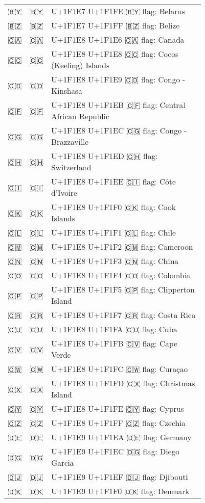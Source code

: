 \documentclass[a4paper,12pt]{ltjarticle}
\newcommand{\fontA}[1]{{\fontspec[RawFeature={mode=harf,+dist,+ccmp}]{Segoe UI Emoji} #1}}
\newcommand{\fontB}[1]{{\fontspec[RawFeature={mode=harf,+dist,+ccmp}]{Noto Color Emoji} #1}}
\begin{document}
\begin{longtable}[c]{ccp{0.8\linewidth}}
\fontA{🇧🇾}&\fontB{🇧🇾}&U+1F1E7 U+1F1FE 🇧🇾 flag: Belarus\\
\fontA{🇧🇿}&\fontB{🇧🇿}&U+1F1E7 U+1F1FF 🇧🇿 flag: Belize\\
\fontA{🇨🇦}&\fontB{🇨🇦}&U+1F1E8 U+1F1E6 🇨🇦 flag: Canada\\
\fontA{🇨🇨}&\fontB{🇨🇨}&U+1F1E8 U+1F1E8 🇨🇨 flag: Cocos (Keeling) Islands\\
\fontA{🇨🇩}&\fontB{🇨🇩}&U+1F1E8 U+1F1E9 🇨🇩 flag: Congo - Kinshasa\\
\fontA{🇨🇫}&\fontB{🇨🇫}&U+1F1E8 U+1F1EB 🇨🇫 flag: Central African Republic\\
\fontA{🇨🇬}&\fontB{🇨🇬}&U+1F1E8 U+1F1EC 🇨🇬 flag: Congo - Brazzaville\\
\fontA{🇨🇭}&\fontB{🇨🇭}&U+1F1E8 U+1F1ED 🇨🇭 flag: Switzerland\\
\fontA{🇨🇮}&\fontB{🇨🇮}&U+1F1E8 U+1F1EE 🇨🇮 flag: Côte d’Ivoire\\
\fontA{🇨🇰}&\fontB{🇨🇰}&U+1F1E8 U+1F1F0 🇨🇰 flag: Cook Islands\\
\fontA{🇨🇱}&\fontB{🇨🇱}&U+1F1E8 U+1F1F1 🇨🇱 flag: Chile\\
\fontA{🇨🇲}&\fontB{🇨🇲}&U+1F1E8 U+1F1F2 🇨🇲 flag: Cameroon\\
\fontA{🇨🇳}&\fontB{🇨🇳}&U+1F1E8 U+1F1F3 🇨🇳 flag: China\\
\fontA{🇨🇴}&\fontB{🇨🇴}&U+1F1E8 U+1F1F4 🇨🇴 flag: Colombia\\
\fontA{🇨🇵}&\fontB{🇨🇵}&U+1F1E8 U+1F1F5 🇨🇵 flag: Clipperton Island\\
\fontA{🇨🇷}&\fontB{🇨🇷}&U+1F1E8 U+1F1F7 🇨🇷 flag: Costa Rica\\
\fontA{🇨🇺}&\fontB{🇨🇺}&U+1F1E8 U+1F1FA 🇨🇺 flag: Cuba\\
\fontA{🇨🇻}&\fontB{🇨🇻}&U+1F1E8 U+1F1FB 🇨🇻 flag: Cape Verde\\
\fontA{🇨🇼}&\fontB{🇨🇼}&U+1F1E8 U+1F1FC 🇨🇼 flag: Curaçao\\
\fontA{🇨🇽}&\fontB{🇨🇽}&U+1F1E8 U+1F1FD 🇨🇽 flag: Christmas Island\\
\fontA{🇨🇾}&\fontB{🇨🇾}&U+1F1E8 U+1F1FE 🇨🇾 flag: Cyprus\\
\fontA{🇨🇿}&\fontB{🇨🇿}&U+1F1E8 U+1F1FF 🇨🇿 flag: Czechia\\
\fontA{🇩🇪}&\fontB{🇩🇪}&U+1F1E9 U+1F1EA 🇩🇪 flag: Germany\\
\fontA{🇩🇬}&\fontB{🇩🇬}&U+1F1E9 U+1F1EC 🇩🇬 flag: Diego Garcia\\
\fontA{🇩🇯}&\fontB{🇩🇯}&U+1F1E9 U+1F1EF 🇩🇯 flag: Djibouti\\
\fontA{🇩🇰}&\fontB{🇩🇰}&U+1F1E9 U+1F1F0 🇩🇰 flag: Denmark\\

\end{longtable}
\end{document}
